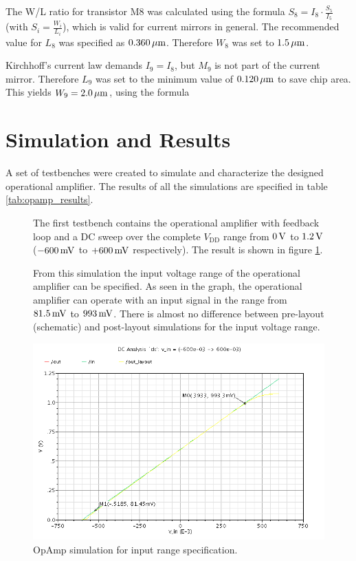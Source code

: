 \documentclass[parskip,oneside,colorbacktitle,10pt,accentcolor=tud1b]{tudreport}
\begin{document}
{The W/L ratio for transistor M8 was calculated using the formula $S_8 = I_8 \cdot \frac{S_5}{I_5}$ (with $S_i = \frac{W_i}{L_i}$), which is valid for current mirrors in general. The recommended value for $L_8$ was specified as $\unit[0.360]{\mu m}$. Therefore $W_8$ was set to $\unit[1.5]{\mu m}$.

Kirchhoff's current law demands $I_9 = I_8$, but $M_9$ is not part of the current mirror. Therefore $L_9$ was set to the minimum value of $\unit[0.120]{\mu m}$ to save chip area. This yields $W_9 = \unit[2.0]{\mu m}$, using the formula 

\section{Simulation and Results}

A set of testbenches were created to simulate and characterize the designed operational amplifier. The results of all the simulations are specified in table \ref{tab:opamp_results}.

\begin{figure}[H]
	\begin{minipage}[t]{0.4\textwidth} 
	\setlength{\parskip}{\currentparskip} %
	\vspace{.3cm}
		The first testbench contains the operational amplifier with feedback loop and a DC sweep over the complete $V_\text{DD}$ range from $\unit[0]{V}$ to $\unit[1.2]{V}$ ($\unit[-600]{mV}$ to $\unit[+600]{mV}$ respectively). The result is shown in figure \ref{fig:opamp_sim1}. 
		
		From this simulation the input voltage range of the operational amplifier can be specified. As seen in the graph, the operational amplifier can operate with an input signal in the range from $\unit[81.5]{mV}$ to $\unit[993]{mV}$. There is almost no difference between pre-layout (schematic) and post-layout simulations for the input voltage range.
	\end{minipage}
	\begin{minipage}[t]{0.55\textwidth} 
		\begin{center}
			\includegraphics[scale=0.4]{opamp_sim1}
		    \caption{OpAmp simulation for input range specification.}
		    \label{fig:opamp_sim1}		
		\end{center}
	\end{minipage}
\end{figure}

}
\end{document}
